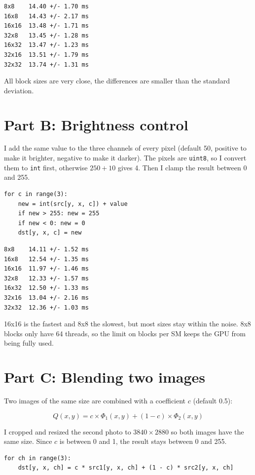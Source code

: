 \documentclass{report}
\begin{document}
\begin{verbatim}
8x8    14.40 +/- 1.70 ms
16x8   14.43 +/- 2.17 ms
16x16  13.48 +/- 1.71 ms
32x8   13.45 +/- 1.28 ms
16x32  13.47 +/- 1.23 ms
32x16  13.51 +/- 1.79 ms
32x32  13.74 +/- 1.31 ms
\end{verbatim}

All block sizes are very close, the differences are smaller than the standard deviation.

\section*{Part B: Brightness control}

I add the same value to the three channels of every pixel (default 50, positive to make it brighter, negative to make it darker). The pixels are \texttt{uint8}, so I convert them to \texttt{int} first, otherwise $250 + 10$ gives 4. Then I clamp the result between 0 and 255.

\begin{verbatim}
for c in range(3):
    new = int(src[y, x, c]) + value
    if new > 255: new = 255
    if new < 0: new = 0
    dst[y, x, c] = new
\end{verbatim}

\begin{verbatim}
8x8    14.11 +/- 1.52 ms
16x8   12.54 +/- 1.35 ms
16x16  11.97 +/- 1.46 ms
32x8   12.33 +/- 1.57 ms
16x32  12.50 +/- 1.33 ms
32x16  13.04 +/- 2.16 ms
32x32  12.36 +/- 1.03 ms
\end{verbatim}

16x16 is the fastest and 8x8 the slowest, but most sizes stay within the noise. 8x8 blocks only have 64 threads, so the limit on blocks per SM keeps the GPU from being fully used.

\section*{Part C: Blending two images}

Two images of the same size are combined with a coefficient $c$ (default 0.5):

\[
Q(x, y) = c \times \Phi_1(x, y) + (1 - c) \times \Phi_2(x, y)
\]

I cropped and resized the second photo to $3840 \times 2880$ so both images have the same size. Since $c$ is between 0 and 1, the result stays between 0 and 255.

\begin{verbatim}
for ch in range(3):
    dst[y, x, ch] = c * src1[y, x, ch] + (1 - c) * src2[y, x, ch]
\end{verbatim}
\end{document}
